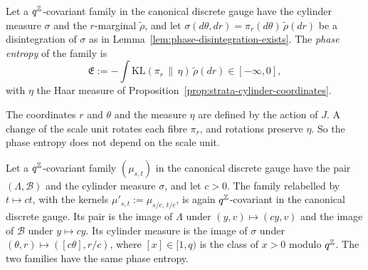 \begin{definition}
\label{def:phase-entropy}

Let a $q^{\mathbb{Z}}$-covariant family in the canonical discrete gauge have the cylinder measure $\sigma$
and the $r$-marginal $\tilde\rho$, and let $\sigma(d\theta, dr) = \pi_r(d\theta)\,\tilde\rho(dr)$ be
a disintegration of $\sigma$ as in Lemma~\ref{lem:phase-disintegration-exists}. The
\emph{phase entropy} of the family is
\[
  \mathfrak{E} := -\int\mathrm{KL}(\pi_r \,\|\, \eta)\,\tilde\rho(dr) \in [-\infty, 0],
\]
with $\eta$ the Haar measure of Proposition~\ref{prop:strata-cylinder-coordinates}.
\end{definition}

The coordinates $r$ and $\theta$ and the measure $\eta$ are defined by the action of $J$. A
change of the scale unit rotates each fibre $\pi_r$, and rotations preserve $\eta$. So the phase
entropy does not depend on the scale unit.

\begin{proposition}
\label{prop:phase-entropy-scale-unit}

Let a $q^{\mathbb{Z}}$-covariant family $(\mu_{s,t})$ in the canonical discrete gauge have the pair
$(\Lambda, \mathcal{B})$ and the cylinder measure $\sigma$, and let $c > 0$. The family relabelled
by $t \mapsto ct$, with the kernels $\mu'_{s,t} := \mu_{s/c,\,t/c}$, is again $q^{\mathbb{Z}}$-covariant
in the canonical discrete gauge. Its pair is the image of $\Lambda$ under $(y, v) \mapsto (cy, v)$
and the image of $\mathcal{B}$ under $y \mapsto cy$. Its cylinder measure is the image of $\sigma$
under $(\theta, r) \mapsto ([c\theta], r/c)$, where $[x] \in [1,q)$ is the class of $x > 0$ modulo
$q^{\mathbb{Z}}$. The two families have the same phase entropy.
\end{proposition}

